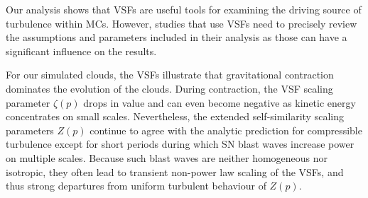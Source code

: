 Our analysis shows that VSFs are useful tools for examining the driving source of turbulence within MCs.
However, studies that use VSFs need to precisely review the assumptions and parameters included in their analysis as those can have a significant influence on the results.

For our simulated clouds, the VSFs illustrate that gravitational contraction dominates the evolution of the clouds.
During contraction, the VSF scaling parameter $\zeta(p)$ drops in value and can even become negative as kinetic energy concentrates on small scales.
Nevertheless, the extended self-similarity scaling parameters $Z(p)$ continue to agree with the analytic prediction for compressible turbulence except for short periods during which SN blast waves increase power on multiple scales.
Because such blast waves are neither homogeneous nor isotropic, they often lead to transient non-power law scaling of the VSFs, and thus strong departures from uniform turbulent behaviour of $Z(p)$.


\endinput
